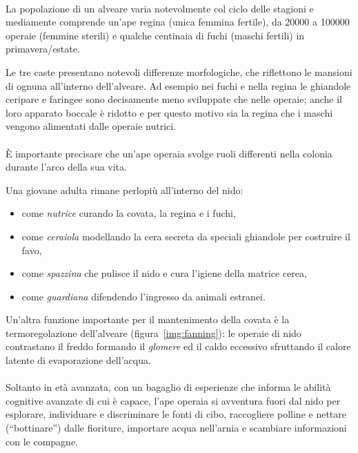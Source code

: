 \paragraph{}
La popolazione di un alveare varia notevolmente col ciclo delle stagioni e mediamente comprende un'ape regina (unica femmina fertile), da 20000 a 100000 operaie (femmine sterili) e qualche centinaia di fuchi (maschi fertili) in primavera/estate.

Le tre caste presentano notevoli differenze morfologiche, che riflettono le mansioni di ognuna all'interno dell'alveare.
Ad esempio nei fuchi e nella regina le ghiandole ceripare e faringee sono decisamente meno sviluppate che nelle operaie; anche il loro apparato boccale è ridotto e per questo motivo sia la regina che i maschi vengono alimentati dalle operaie nutrici.

\paragraph{}
È importante precisare che un'ape operaia svolge ruoli differenti nella colonia durante l'arco della sua vita.

Una giovane adulta rimane perlopiù all'interno del nido:
\begin{itemize}
    \item come \emph{nutrice} curando la covata, la regina e i fuchi,
    \item come \emph{ceraiola} modellando la cera secreta da speciali ghiandole per costruire il favo,
    \item come \emph{spazzina} che pulisce il nido e cura l'igiene della matrice cerea,
    \item come \emph{guardiana} difendendo l'ingresso da animali estranei.
\end{itemize}

Un'altra funzione importante per il mantenimento della covata è la termoregolazione dell'alveare (figura~\ref{img:fanning}):
le operaie di nido contrastano il freddo formando il \emph{glomere} ed il caldo eccessivo sfruttando il calore latente di evaporazione dell'acqua.

\paragraph{}
Soltanto in età avanzata, con un bagaglio di esperienze che informa le abilità cognitive avanzate di cui è capace, l'ape operaia si avventura fuori dal nido per esplorare, individuare e discriminare le fonti di cibo, raccogliere polline e nettare (``bottinare'') dalle fioriture, importare acqua nell'arnia e scambiare informazioni con le compagne.

